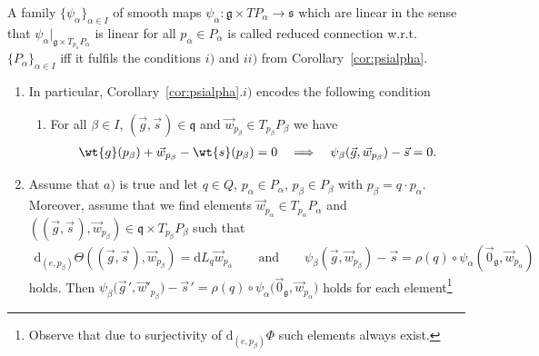 \begin{Definition}
A family $\{\psi_\alpha\}_{\alpha\in I}$ of smooth maps $\psi_\alpha\colon \mathfrak{g}\times TP_\alpha \rightarrow
\mathfrak{s}$ which are linear in the sense that $\psi_\alpha|_{\mathfrak{g}\times T_{p_\alpha}P_\alpha }$ is linear for
all $p_\alpha\in P_\alpha$ is called reduced connection w.r.t.~$\{P_\alpha\}_{\alpha\in I}$ if\/f it fulf\/ils the
conditions $i)$ and $ii)$ from Corollary~\ref{cor:psialpha}.
\end{Definition}
\begin{Remark}\label{rem:Psialphaconderkl}\quad
\begin{enumerate}\itemsep=0pt
\item[1)] In particular, Corollary~\ref{cor:psialpha}.$i)$ encodes the following condition
\begin{enumerate}\itemsep=0pt
\item[$a)$] For all $\beta \in I$, $(\vec{g},\vec{s}\hspace{1pt})\in \mathfrak{q}$ and $\vec{w}_{p_\beta}\in
T_{p_\beta}P_\beta$ we have
\begin{gather*}
\wt{g}(p_\beta) +\vec{w}_{p_\beta}-\wt{s}(p_\beta)=0
\quad
\Longrightarrow
\quad
\psi_\beta(\vec{g},\vec{w}_{p_\beta})-\vec{s}=0.
\end{gather*}
\end{enumerate}
\item[2)] Assume that $a)$ is true and let $q\in Q$, $p_\alpha\in P_\alpha$, $p_\beta \in
P_\beta$ with $p_\beta=q\cdot p_\alpha$.
Moreover, assume that we f\/ind elements $\vec{w}_{p_\alpha}\in T_{p_\alpha}P_\alpha$ and
$((\vec{g},\vec{s}\hspace{1pt}),\vec{w}_{p_\beta})\in \mathfrak{q}\times T_{p_\beta}P_\beta$ such that
\begin{gather*}
\mathrm{d}_{(e,p_\beta)}\Theta((\vec{g},\vec{s}\hspace{1pt}),\vec{w}_{p_\beta})=\mathrm{d} L_q\vec{w}_{p_\alpha}
\qquad
\text{and}
\qquad
\psi_\beta(\vec{g},\vec{w}_{p_\beta})-\vec{s}=\rho(q)\circ\psi_\alpha(\vec{0}_{\mathfrak{g}},\vec{w}_{p_\alpha})
\end{gather*}
holds.
Then
$\psi_\beta\big(\vec{g}\hspace{1pt}{}',\vec{w}'_{p_\beta}\big)-\vec{s}\hspace{1pt}{}'
=\rho(q)\circ\psi_\alpha\big(\vec{0}_{\mathfrak{g}},\vec{w}_{p_\alpha}\big)$
holds for each element\footnote{Observe that due to surjectivity of $\mathrm{d}_{(e,p_\beta)}\Phi$ such elements always exist.}

\end{enumerate}
\end{Remark}
